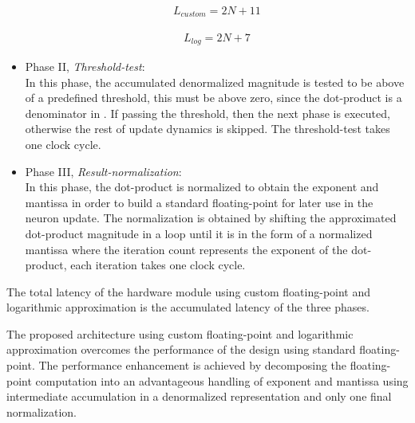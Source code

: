 \begin{itemize}
 	\begin{eqnarray} \label{eq:dot_standard_custom_float_latency}
 	L_{custom}=2N+11
 	\end{eqnarray}
 	
	\begin{eqnarray} \label{eq:dot_log_latency}
 	L_{log}=2N+7
 	\end{eqnarray}
 	
 	\item{Phase II, \emph{Threshold-test}}: \\
	In this phase, the accumulated denormalized magnitude is tested to be above of a predefined threshold, this must be above zero, since the dot-product is a denominator in .
 	If passing the threshold, then the next phase is executed, otherwise the rest of update dynamics is skipped. The threshold-test takes one clock cycle.
 	\item{Phase III, \emph{Result-normalization}}: \\
 	In this phase, the dot-product is normalized to obtain the exponent and mantissa in order to build a standard floating-point for later use in the neuron update. The normalization is obtained by shifting the approximated dot-product magnitude in a loop until it is in the form of a normalized mantissa where the iteration count represents the exponent of the dot-product, each iteration takes one clock cycle.
 	
 \end{itemize}


The total latency of the hardware module using custom floating-point and logarithmic approximation is the accumulated latency of the three phases.

The proposed architecture using custom floating-point and logarithmic approximation overcomes the performance of the design using standard floating-point. The performance enhancement is achieved by decomposing the floating-point computation into an advantageous handling of exponent and mantissa using intermediate accumulation in a denormalized representation and only one final normalization.

